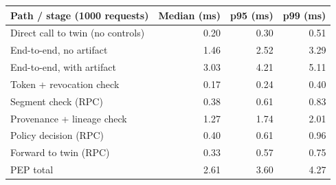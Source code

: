 \begin{tabular}{@{}lrrr@{}}
\toprule
Path / stage (1000 requests) & Median (ms) & p95 (ms) & p99 (ms) \\
\midrule
Direct call to twin (no controls) & 0.20 & 0.30 & 0.51 \\
End-to-end, no artifact & 1.46 & 2.52 & 3.29 \\
End-to-end, with artifact & 3.03 & 4.21 & 5.11 \\
\midrule
Token + revocation check & 0.17 & 0.24 & 0.40 \\
Segment check (RPC) & 0.38 & 0.61 & 0.83 \\
Provenance + lineage check & 1.27 & 1.74 & 2.01 \\
Policy decision (RPC) & 0.40 & 0.61 & 0.96 \\
Forward to twin (RPC) & 0.33 & 0.57 & 0.75 \\
PEP total & 2.61 & 3.60 & 4.27 \\
\bottomrule
\end{tabular}
